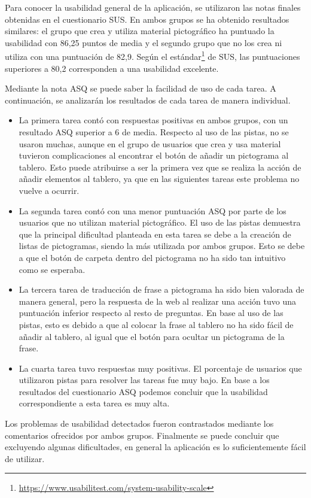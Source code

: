 Para conocer la usabilidad general de la aplicación, se utilizaron las notas finales obtenidas en el cuestionario SUS. En ambos grupos se ha obtenido resultados similares: el grupo que crea y utiliza material pictográfico ha puntuado la usabilidad con 86,25 puntos de media y el segundo grupo que no los crea ni utiliza con una puntuación de 82,9. Según el estándar\footnote{\url{https://www.usabilitest.com/system-usability-scale}} de SUS, las puntuaciones superiores a 80,2 corresponden a una usabilidad excelente. 


Mediante la nota ASQ se puede saber la facilidad de uso de cada tarea. A continuación, se analizarán los resultados de cada tarea de manera individual.

\begin{itemize}
	\item La primera tarea contó con respuestas positivas en ambos grupos, con un resultado ASQ superior a 6 de media. Respecto al uso de las pistas, no se usaron muchas, aunque en el grupo de usuarios que crea y usa material tuvieron complicaciones al encontrar el botón de añadir un pictograma al tablero. Esto puede atribuirse a ser la primera vez que se realiza la acción de añadir elementos al tablero, ya que en las siguientes tareas este problema no vuelve a ocurrir. 
	
	\item La segunda tarea contó con una menor puntuación ASQ por parte de los usuarios que no utilizan material pictográfico. El uso de las pistas demuestra que la principal dificultad planteada en esta tarea se debe a la creación de listas de pictogramas, siendo la más utilizada por ambos grupos. Esto se debe a que el botón de carpeta dentro del pictograma no ha sido tan intuitivo como se esperaba. 
	
	
	\item La tercera tarea de traducción de frase a pictograma ha sido bien valorada de manera general, pero la respuesta de la web al realizar una acción tuvo una puntuación inferior respecto al resto de preguntas. En base al uso de las pistas, esto es debido a que al colocar la frase al tablero no ha sido fácil de añadir al tablero, al igual que el botón para ocultar un pictograma de la frase. 
	
	
	\item La cuarta tarea tuvo respuestas muy positivas. El porcentaje de usuarios que utilizaron pistas para resolver las tareas fue muy bajo. En base a los resultados del cuestionario ASQ podemos concluir que la usabilidad correspondiente a esta tarea es muy alta.
\end{itemize}

Los problemas de usabilidad detectados fueron contrastados mediante los comentarios ofrecidos por ambos grupos. Finalmente se puede concluir que excluyendo algunas dificultades, en general la aplicación es lo suficientemente fácil de utilizar.
